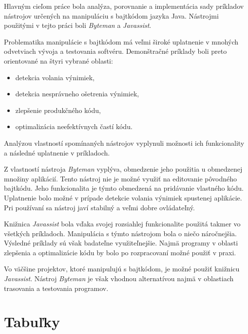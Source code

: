 \documentclass[11pt,final,oneside]{fithesis}
\begin{document}
Hlavným cieľom práce bola analýza, porovnanie a implementácia sady príkladov
nástrojov určených na manipuláciu s bajtkódom jazyka Java. Nástrojmi použitými
v tejto práci boli \textit{Byteman} a \textit{Javassist}. 

Problematika manipulácie s bajtkódom má veľmi široké uplatnenie v mnohých
odvetviach vývoja a testovania softvéru. Demonštračné príklady boli preto
orientované na štyri vybrané oblasti:

\begin{itemize}
\item detekcia volania výnimiek,
\item detekcia nesprávneho ošetrenia výnimiek,
\item zlepšenie produkčného kódu,
\item optimalizácia neefektívnych častí kódu.
\end{itemize}

Analýzou vlastností spomínaných nástrojov vyplynuli možnosti ich funkcionality
a následné uplatnenie v príkladoch. 

Z vlastností nástroja \textit{Byteman} vyplýva, obmedzenie jeho použitia u
obmedzenej množiny aplikácií. Tento nástroj nie je možné využiť na 
editovanie pôvodného bajtkódu. Jeho funkcionalita je týmto obmedzená
na pridávanie vlastného kódu. Uplatnenie bolo možné v prípade
detekcie volania výnimiek spustenej aplikácie. Pri používaní sa nástroj javí
stabilný a veľmi dobre ovládateľný.

Knižnica \textit{Javassist} bola vďaka svojej rozsiahlej funkcionalite použitá
takmer vo všetkých príkladoch. Manipulácia s týmto nástrojom bola o niečo
náročnejšia. Výsledné príklady sú však badateľne využiteľnejšie. Najmä
programy v oblasti zlepšenia a optimalizácie kódu by bolo po rozpracovaní možné
použiť v praxi.

Vo väčšine projektov, ktoré manipulujú s bajtkódom, je možné použiť knižnicu
\textit{Javassist}. Nástroj \textit{Byteman} je však vhodnou alternatívou najmä
v oblastiach trasovania a testovania programov.

\nocite{RedHat:Javassist}
\clearpage
{} 
 
 

\appendix

\chapter{Tabuľky}

\end{document}
